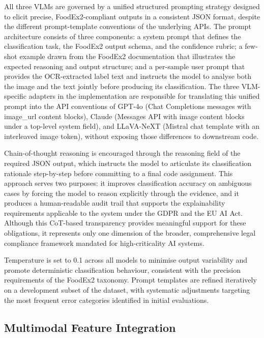 All three VLMs are governed by a unified structured prompting strategy designed to elicit precise, FoodEx2-compliant outputs in a consistent JSON format, despite the different prompt-template conventions of the underlying APIs. The prompt architecture consists of three components: a system prompt that defines the classification task, the FoodEx2 output schema, and the confidence rubric; a few-shot example drawn from the FoodEx2 documentation that illustrates the expected reasoning and output structure; and a per-sample user prompt that provides the OCR-extracted label text and instructs the model to analyse both the image and the text jointly before producing its classification. The three VLM-specific adapters in the implementation are responsible for translating this unified prompt into the API conventions of GPT-4o (Chat Completions messages with image\_url content blocks), Claude (Messages API with image content blocks under a top-level system field), and LLaVA-NeXT (Mistral chat template with an interleaved image token), without exposing those differences to downstream code.

Chain-of-thought reasoning is encouraged through the reasoning field of the required JSON output, which instructs the model to articulate its classification rationale step-by-step before committing to a final code assignment. This approach serves two purposes: it improves classification accuracy on ambiguous cases by forcing the model to reason explicitly through the evidence, and it produces a human-readable audit trail that supports the explainability requirements applicable to the system under the GDPR and the EU AI Act. Although this CoT-based transparency provides meaningful support for these obligations, it represents only one dimension of the broader, comprehensive legal compliance framework mandated for high-criticality AI systems.

Temperature is set to 0.1 across all models to minimise output variability and promote deterministic classification behaviour, consistent with the precision requirements of the FoodEx2 taxonomy. Prompt templates are refined iteratively on a development subset of the dataset, with systematic adjustments targeting the most frequent error categories identified in initial evaluations.

\hypertarget{multimodal-feature-integration}{%
\subsection{Multimodal Feature Integration}\label{multimodal-feature-integration}}

